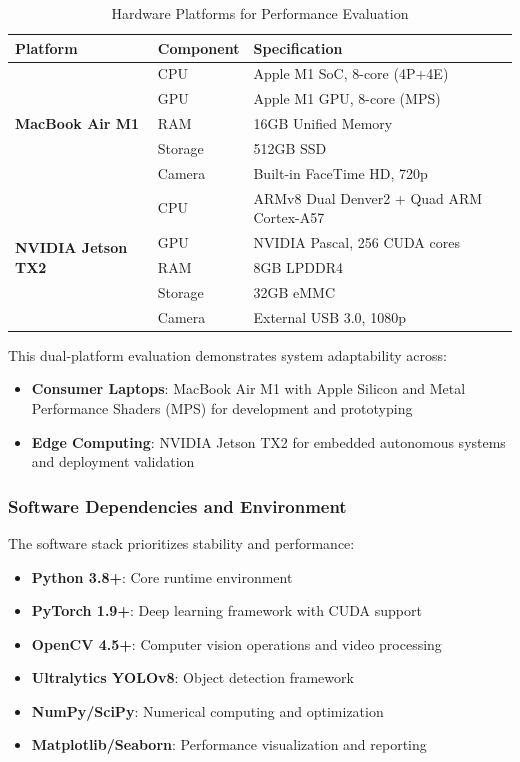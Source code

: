 \documentclass[12pt,oneside]{book}
\begin{document}
\begin{table}[ht]
\centering
\caption{Hardware Platforms for Performance Evaluation}
\label{tab:hardware_config}
\begin{tabular}{@{}lll@{}}
\toprule
\textbf{Platform} & \textbf{Component} & \textbf{Specification} \\
\midrule
\multirow{5}{*}{\textbf{MacBook Air M1}} & CPU & Apple M1 SoC, 8-core (4P+4E) \\
 & GPU & Apple M1 GPU, 8-core (MPS) \\
 & RAM & 16GB Unified Memory \\
 & Storage & 512GB SSD \\
 & Camera & Built-in FaceTime HD, 720p \\
\midrule
\multirow{5}{*}{\textbf{NVIDIA Jetson TX2}} & CPU & ARMv8 Dual Denver2 + Quad ARM Cortex-A57 \\
 & GPU & NVIDIA Pascal, 256 CUDA cores \\
 & RAM & 8GB LPDDR4 \\
 & Storage & 32GB eMMC \\
 & Camera & External USB 3.0, 1080p \\
\bottomrule
\end{tabular}
\end{table}

This dual-platform evaluation demonstrates system adaptability across:
\begin{itemize}
\item \textbf{Consumer Laptops}: MacBook Air M1 with Apple Silicon and Metal Performance Shaders (MPS) for development and prototyping
\item \textbf{Edge Computing}: NVIDIA Jetson TX2 for embedded autonomous systems and deployment validation
\end{itemize}

\subsubsection{Software Dependencies and Environment}

The software stack prioritizes stability and performance:

\begin{itemize}
\item \textbf{Python 3.8+}: Core runtime environment
\item \textbf{PyTorch 1.9+}: Deep learning framework with CUDA support
\item \textbf{OpenCV 4.5+}: Computer vision operations and video processing
\item \textbf{Ultralytics YOLOv8}: Object detection framework
\item \textbf{NumPy/SciPy}: Numerical computing and optimization
\item \textbf{Matplotlib/Seaborn}: Performance visualization and reporting
\end{itemize}
\end{document}
